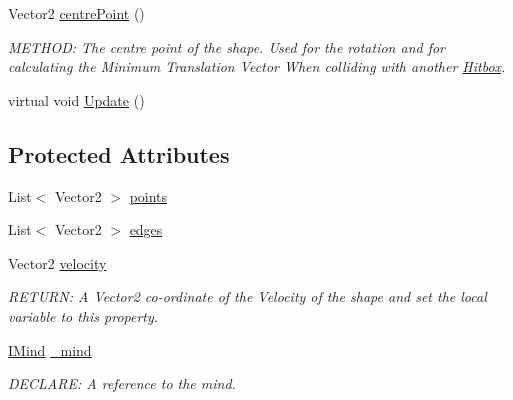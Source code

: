 \begin{DoxyCompactItemize}
Vector2 \hyperlink{a00506_ad129f58518e4fedffc47433af729b3bf}{centre\+Point} ()
\begin{DoxyCompactList}\small\item\em M\+E\+T\+H\+OD\+: The centre point of the shape. Used for the rotation and for calculating the Minimum Translation Vector When colliding with another \hyperlink{a00506}{Hitbox}. \end{DoxyCompactList}\item 
virtual void \hyperlink{a00506_a987b7fd544e03a9e43e38cc2df785d1d}{Update} ()
\end{DoxyCompactItemize}
\subsection*{Protected Attributes}
\begin{DoxyCompactItemize}
\item 
List$<$ Vector2 $>$ \hyperlink{a00506_ad49c6d92bbdffabb12c2a7a4c7fa3840}{points}
\item 
List$<$ Vector2 $>$ \hyperlink{a00506_a4128afb1364d3a25e1091055ef46dda2}{edges}
\item 
Vector2 \hyperlink{a00506_a4bfe4a9151e1af19d18f92b4cfba46b6}{velocity}
\begin{DoxyCompactList}\small\item\em R\+E\+T\+U\+RN\+: A Vector2 co-\/ordinate of the Velocity of the shape and set the local variable to this property. \end{DoxyCompactList}\item 
\hyperlink{a00446}{I\+Mind} \hyperlink{a00506_a46b5b73419f520327a67808cd768a666}{\+\_\+mind}
\begin{DoxyCompactList}\small\item\em D\+E\+C\+L\+A\+RE\+: A reference to the mind. \end{DoxyCompactList}\end{DoxyCompactItemize}

